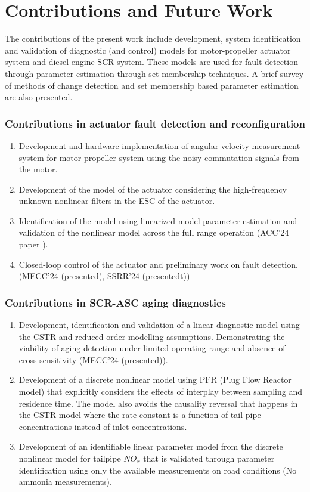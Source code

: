 \chapter{Contributions and Future Work}
The contributions of the present work include development, system identification and validation of diagnostic (and control) models for motor-propeller actuator system and diesel engine SCR system. These models are used for fault detection through parameter estimation through set membership techniques. A brief survey of methods of change detection and set membership based parameter estimation are also presented.

\subsection{Contributions in actuator fault detection and reconfiguration}
\begin{enumerate}
        \item Development and hardware implementation of angular velocity measurement system for motor propeller system using the noisy commutation signals from the motor.
        \item Development of the model of the actuator considering the high-frequency unknown nonlinear filters in the ESC of the actuator.
        \item Identification of the model using linearized model parameter estimation and validation of the nonlinear model across the full range operation (ACC'24 paper \cite{seshaIdent}).
        \item Closed-loop control of the actuator and preliminary work on fault detection. (MECC'24 (presented), SSRR'24 (presentedt))
\end{enumerate}

\subsection{Contributions in SCR-ASC aging diagnostics}
\begin{enumerate}
        \item Development, identification and validation of a linear diagnostic model using the CSTR and reduced order modelling assumptions. Demonstrating the viability of aging detection under limited operating range and absence of cross-sensitivity (MECC'24 (presented)).
        \item Development of a discrete nonlinear model using PFR (Plug Flow Reactor model) that explicitly considers the effects of interplay between sampling and residence time. The model also avoids the causality reversal that happens in the CSTR model where the rate constant is a function of tail-pipe concentrations instead of inlet concentrations.
        \item Development of an identifiable linear parameter model from the discrete nonlinear model for tailpipe $NO_x$ that is validated through parameter identification using only the available measurements on road conditions (No ammonia measurements).
\end{enumerate}

